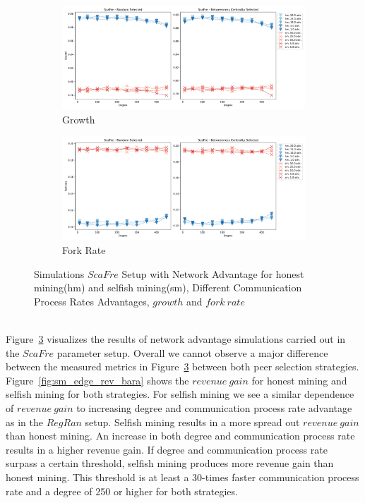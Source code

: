 \begin{figure}[tbp]
\begin{subfigure}[b]{\textwidth}
		\includegraphics[width=\textwidth]{figures/sm_edge_growth_barabasi.pdf}
		\caption{Growth}
		\label{fig:growth_bara}
	\end{subfigure}
	\begin{subfigure}[b]{\textwidth}
		\includegraphics[width=\textwidth]{figures/sm_edge_forkrate_barabasi.pdf}
		\caption{Fork Rate}
		\label{fig:fork_bara}
	\end{subfigure}
\caption{Simulations $ScaFre$ Setup with Network Advantage for honest mining(hm) and selfish mining(sm), Different Communication Process Rates Advantages, $growth$ and $fork~rate$}
\label{fig:sm_edge_barabasi}
\end{figure}\\
Figure~\ref{fig:sm_edge_barabasi} visualizes the results of network advantage simulations carried out in the $ScaFre$ parameter setup. Overall we cannot observe a major difference between the measured metrics in Figure~\ref{fig:sm_edge_barabasi} between both peer selection strategies. Figure~\ref{fig:sm_edge_rev_bara} shows the $revenue~gain$ for honest mining and selfish mining for both strategies. For selfish mining we see a similar dependence of $revenue~gain$ to increasing degree and communication process rate advantage as in the $RegRan$ setup. Selfish mining results in a more spread out $revenue~gain$ than honest mining. An increase in both degree and communication process rate results in a higher revenue gain. If degree and communication process rate surpass a certain threshold, selfish mining produces more revenue gain than honest mining. This threshold is at least a 30-times faster communication process rate and a degree of 250 or higher for both strategies.\\
